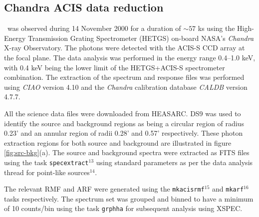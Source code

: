     \subsection{Chandra ACIS data reduction}
    	\source\ was observed during 14 November 2000 for a duration of $\sim 57$ ks using the High-Energy Transmission Grating Spectrometer (HETGS) on-board NASA's \textit{Chandra} X-ray Observatory. %
    	The photons were detected with the ACIS-S CCD array at the focal plane. The data analysis was performed in the energy range 0.4--1.0 keV, with 0.4 keV being the lower limit of the HETGS+ACIS-S spectrometer combination. The extraction of the spectrum and response files was performed using \textit{CIAO} version 4.10 and the \textit{Chandra} calibration database \textit{CALDB} version 4.7.7.
    	
    	All the science data files were downloaded from HEASARC. DS9 was used to identify the source and background regions as being a circular region of radius 0.23' and an annular region of radii 0.28' and 0.57' respectively. These photon extraction regions for both source and background are illustrated in figure \ref{fig:src-bkg}(a). The source and background spectra were extracted as FITS files using the task \texttt{specextract}$^{13}$ using standard parameters as per the data analysis thread for point-like sources$^{14}$. %
    	
    	The relevant RMF and ARF were generated using the \texttt{mkacisrmf}$^{15}$ and \texttt{mkarf}$^{16}$ tasks respectively. The spectrum set was grouped and binned to have a minimum of 10 counts/bin using the task \texttt{grphha} for subsequent analysis using XSPEC.
    	
